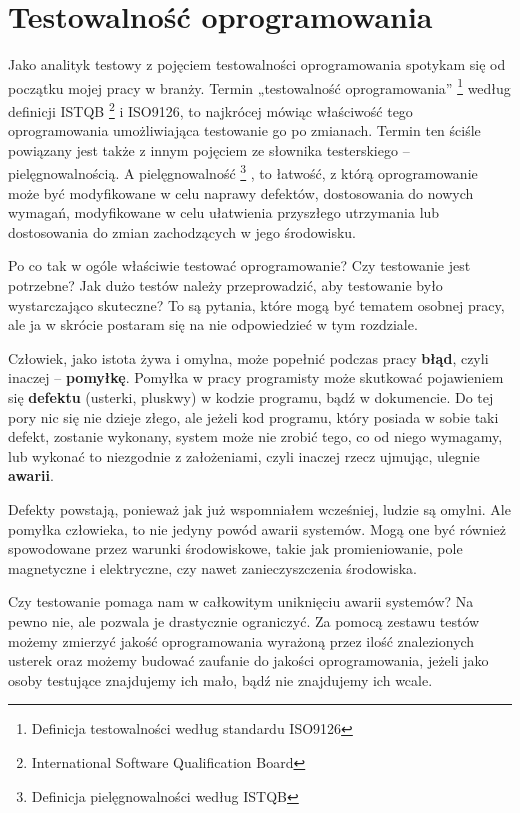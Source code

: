 \chapter{Testowalność oprogramowania}

Jako analityk testowy z pojęciem testowalności oprogramowania spotykam się od początku mojej pracy w branży. Termin „testowalność oprogramowania” \footnote{Definicja testowalności według standardu ISO9126}  według definicji ISTQB \footnote{International Software Qualification Board}  i ISO9126, to najkrócej mówiąc właściwość tego oprogramowania umożliwiająca testowanie go po zmianach. Termin ten ściśle powiązany jest także z innym pojęciem ze słownika testerskiego – pielęgnowalnością. A pielęgnowalność \footnote{Definicja pielęgnowalności według ISTQB} , to łatwość, z którą oprogramowanie może być modyfikowane w celu naprawy defektów, dostosowania do nowych wymagań, modyfikowane w celu ułatwienia przyszłego utrzymania lub dostosowania do zmian zachodzących w jego środowisku.

Po co tak w ogóle właściwie testować oprogramowanie? Czy testowanie jest potrzebne? Jak dużo testów należy przeprowadzić, aby testowanie było wystarczająco skuteczne? To są pytania, które mogą być tematem osobnej pracy, ale ja w skrócie postaram się na nie odpowiedzieć w tym rozdziale.

Człowiek, jako istota żywa i omylna, może popełnić podczas pracy \textbf{błąd}, czyli inaczej – \textbf{pomyłkę}. Pomyłka w pracy programisty może skutkować pojawieniem się \textbf{defektu} (usterki, pluskwy) w kodzie programu, bądź w dokumencie. Do tej pory nic się nie dzieje złego, ale jeżeli kod programu, który posiada w sobie taki defekt, zostanie wykonany, system może nie zrobić tego, co od niego wymagamy, lub wykonać to niezgodnie z założeniami, czyli inaczej rzecz ujmując, ulegnie \textbf{awarii}. 

Defekty powstają, ponieważ jak już wspomniałem wcześniej, ludzie są omylni. Ale pomyłka człowieka, to nie jedyny powód awarii systemów. Mogą one być również spowodowane przez warunki środowiskowe, takie jak promieniowanie, pole magnetyczne i elektryczne, czy nawet zanieczyszczenia środowiska.

Czy testowanie pomaga nam w całkowitym uniknięciu awarii systemów? Na pewno nie, ale pozwala je drastycznie ograniczyć. Za pomocą zestawu testów możemy zmierzyć jakość oprogramowania wyrażoną przez ilość znalezionych usterek oraz możemy budować zaufanie do jakości oprogramowania, jeżeli jako osoby testujące znajdujemy ich mało, bądź nie znajdujemy ich wcale.


